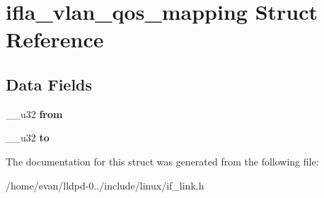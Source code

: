 \section{ifla\-\_\-vlan\-\_\-qos\-\_\-mapping \-Struct \-Reference}
\label{structifla__vlan__qos__mapping}
\subsection*{\-Data \-Fields}
\begin{DoxyCompactItemize}
\item 
\-\_\-\-\_\-u32 {\bfseries from}\label{structifla__vlan__qos__mapping_acf03935076dcdc18f0a35040f03ac562}

\item 
\-\_\-\-\_\-u32 {\bfseries to}\label{structifla__vlan__qos__mapping_a81f357e87842063295c45a5c391c5ccf}

\end{DoxyCompactItemize}


\-The documentation for this struct was generated from the following file\-:\begin{DoxyCompactItemize}
\item 
/home/evan/lldpd-\/0../include/linux/if\-\_\-link.\-h\end{DoxyCompactItemize}

